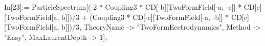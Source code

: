 In[23]:= ParticleSpectrum[(-2 * Coupling3 * CD[-b][TwoFormField[-a, -c]] * CD[c][TwoFormField[a, b]])/3 + (Coupling3 * CD[-c][TwoFormField[-a, -b]] * CD[c][TwoFormField[a, b]])/3, TheoryName -> "TwoFormEectrodynamics", Method -> "Easy", MaxLaurentDepth -> 1]; 